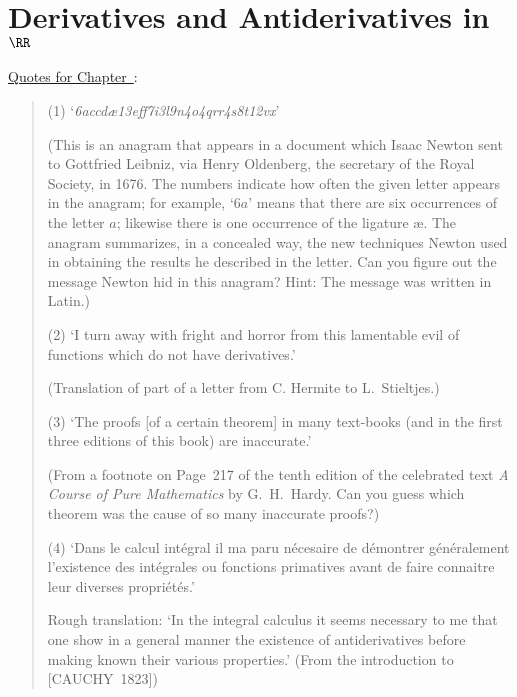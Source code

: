 
%
%


                  \chapter{Derivatives and Antiderivatives in ${\RR}$}
                  \label{ChaptE}


        \underline{Quotes for Chapter~}: 

\V

\begin{quotation}
{\footnotesize
        (1) `{\em 6accd{\ae}13eff7i3l9n4o4qrr4s8t12vx}'

        (This is an anagram that appears in a document which Isaac Newton sent to Gottfried Leibniz, via Henry Oldenberg, the secretary of the Royal Society, in 1676.
    The numbers indicate how often the given letter appears in the anagram; for example, `$6a$' means that there are six occurrences of the letter $a$; likewise there is one occurrence of the ligature {\ae}.
    The anagram summarizes, in a concealed way, the new techniques Newton used in obtaining the results he described in the letter.
    Can you figure out the message Newton hid in this anagram? Hint: The message was written in Latin.)


\V  

        (2) `I turn away with fright and horror from this lamentable evil of functions which do not have derivatives.'

        (Translation of part of a letter from C. Hermite to L.~Stieltjes.) 

\V

        (3) `The proofs [of a certain theorem] in many text-books (and in the first three editions of this book) are inaccurate.'

        (From a footnote on Page~217 of the tenth edition of the celebrated text {\em A Course of Pure Mathematics} by G.~H.~Hardy.
    Can you guess which theorem was the cause of so many inaccurate proofs?)

\V

        (4) `Dans le calcul int\'{e}gral il ma paru n\'{e}cesaire de d\'{e}montrer g\'{e}n\'{e}ralement
    l'existence des int\'{e}grales ou fonctions primatives avant de faire connaitre leur diverses propri\'{e}t\'{e}s.'

        Rough translation: `In the integral calculus it seems necessary to me that one show in a general manner
    the existence of antiderivatives before making known their various properties.' (From the introduction to [CAUCHY~1823])

\V

}%
\end{quotation}

